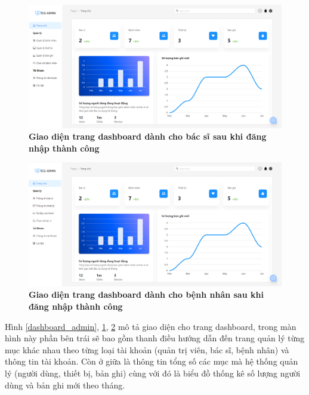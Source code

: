 \begin{figure}[H]
  \centering
  \includegraphics[scale=0.4]{Images/server/webUI/dashboard_doctor.png}
  \caption[Giao diện trang dashboard dành cho bác sĩ sau khi đăng nhập thành công]{\bfseries \fontsize{12pt}{0pt}\selectfont Giao diện trang dashboard dành cho bác sĩ sau khi đăng nhập thành công}
  \label{dashboard_doctor} %
\end{figure}

\begin{figure}[H]
  \centering
  \includegraphics[scale=0.4]{Images/server/webUI/dashboard_patient.png}
  \caption[Giao diện trang dashboard dành cho bệnh nhân sau khi đăng nhập thành công]{\bfseries \fontsize{12pt}{0pt}\selectfont Giao diện trang dashboard dành cho bệnh nhân sau khi đăng nhập thành công}
  \label{dashboard_patient} %
\end{figure}

Hình \ref{dashboard_admin}, \ref{dashboard_doctor}, \ref{dashboard_patient} mô tả giao diện cho trang dashboard, trong màn hình này phần bên trái sẽ bao
 gồm thanh điều hướng dẫn đến trang quản lý từng mục khác nhau theo từng loại tài khoản (quản trị viên, bác sĩ, bệnh nhân) và 
 thông tin tài khoản. Còn ở giữa là thông tin tổng số các mục mà hệ thống quản lý (người dùng, thiết bị, bản ghi)
 cùng với đó là biểu đồ thống kê số lượng người dùng và bản ghi mới theo tháng.

